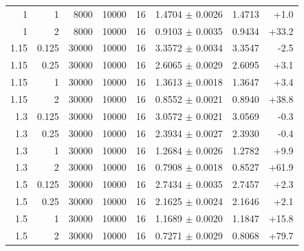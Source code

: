 {\begin{longtable}[]{@{}rrrrrrrr@{}}
1 & 1 & 8000 & 10000 & 16 & 1.4704 $\pm$ 0.0026 & 1.4713 & +1.0 \\
1 & 2 & 8000 & 10000 & 16 & 0.9103 $\pm$ 0.0035 & 0.9434 & +33.2 \\
1.15 & 0.125 & 30000 & 10000 & 16 & 3.3572 $\pm$ 0.0034 & 3.3547 & -2.5 \\
1.15 & 0.25 & 30000 & 10000 & 16 & 2.6065 $\pm$ 0.0029 & 2.6095 & +3.1 \\
1.15 & 1 & 30000 & 10000 & 16 & 1.3613 $\pm$ 0.0018 & 1.3647 & +3.4 \\
1.15 & 2 & 30000 & 10000 & 16 & 0.8552 $\pm$ 0.0021 & 0.8940 & +38.8 \\
1.3 & 0.125 & 30000 & 10000 & 16 & 3.0572 $\pm$ 0.0021 & 3.0569 & -0.3 \\
1.3 & 0.25 & 30000 & 10000 & 16 & 2.3934 $\pm$ 0.0027 & 2.3930 & -0.4 \\
1.3 & 1 & 30000 & 10000 & 16 & 1.2684 $\pm$ 0.0026 & 1.2782 & +9.9 \\
1.3 & 2 & 30000 & 10000 & 16 & 0.7908 $\pm$ 0.0018 & 0.8527 & +61.9 \\
1.5 & 0.125 & 30000 & 10000 & 16 & 2.7434 $\pm$ 0.0035 & 2.7457 & +2.3 \\
1.5 & 0.25 & 30000 & 10000 & 16 & 2.1625 $\pm$ 0.0024 & 2.1646 & +2.1 \\
1.5 & 1 & 30000 & 10000 & 16 & 1.1689 $\pm$ 0.0020 & 1.1847 & +15.8 \\
1.5 & 2 & 30000 & 10000 & 16 & 0.7271 $\pm$ 0.0029 & 0.8068 & +79.7 \\
\end{longtable}
}

